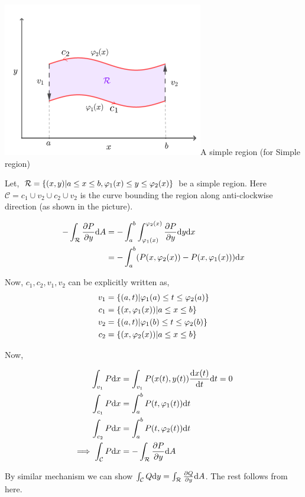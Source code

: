 \documentclass[../Analysis-3]{subfiles}
\begin{document}
\begin{proofFig}{\includegraphics[width=.78\linewidth]{../figures/lec-28.1.png}}{A simple region} (for Simple region)

    Let, $\mathcal{R} = \qty{(x,y) | a\le x\le b, \varphi_1(x) \le y \le \varphi_2(x)}$ be a simple region. Here $\mathcal{C} = c_1 \cup v_2 \cup c_2 \cup v_2$ is the curve bounding the region along anti-clockwise direction (as shown in the picture).

    \begin{align*}
        -\int_{\mathcal{R}} \pdv{P}{y} \dd A & = -\int_{a}^{b} \int_{\varphi_1(x)}^{\varphi_2(x)} \pdv{P}{y} \dd y \dd x \\
                                             & = - \int_{a}^{b} (P(x,\varphi_2(x))-P(x,\varphi_1(x))) \dd x              \\
    \end{align*}

    Now, $c_1,c_2,v_1,v_2$ can be explicitly written as,
    \begin{align*}
        v_1 & = \qty{(a,t) | \varphi_1(a) \le t \le \varphi_2(a)} \\
        c_1 & = \qty{(x,\varphi_1(x)) | a \le x \le b}            \\
        v_2 & = \qty{(a,t) | \varphi_1(b) \le t \le \varphi_2(b)} \\
        c_2 & = \qty{(x,\varphi_2(x)) | a \le x \le b}
    \end{align*}

    Now,

    \begin{align*}
        \int_{v_1} P \dd x                 & = \int_{v_1} P(x(t),y(t)) \dv{x(t)}{t} \dd t = 0 \\
        \int_{c_1} P \dd x                 & = \int_{a}^{b} P(t,\varphi_1(t)) \dd t           \\
        \int_{c_2} P \dd x                 & = \int_{a}^{b} P(t,\varphi_2(t)) \dd t           \\
        \implies \int_{\mathcal{C}} P\dd x & = -\int_{\mathcal{R}} \pdv{P}{y} \dd A
    \end{align*}


    By similar mechanism we can show $\int_{\mathcal{C}} Q \dd y = \int_{\mathcal{R}} \pdv{Q}{y} \dd A$. The rest follows from here.
\end{proofFig}
\end{document}
